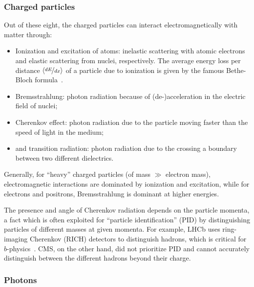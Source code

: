\subsubsection{Charged particles}

Out of these eight, the charged particles can interact electromagnetically with matter through:
\begin{itemize}
    \item Ionization and excitation of atoms: inelastic scattering with atomic electrons and elastic scattering from nuclei, respectively.
    The average energy loss per distance $\left\langle \cnicefrac{dE}{dx}\right\rangle$ of a particle due to ionization is given by the famous Bethe-Bloch formula~\cite{bethe1953passage}.
    \item Bremsstrahlung: photon radiation because of (de-)acceleration in the electric field of nuclei;
    \item Cherenkov effect: photon radiation due to the particle moving faster than the speed of light in the medium;
    \item and transition radiation: photon radiation due to the crossing a boundary between two different dielectrics.
\end{itemize}
Generally, for ``heavy'' charged particles (of mass $\gg$ electron mass), electromagnetic interactions are dominated by ionization and excitation, while for electrons and positrons, Bremsstrahlung is dominant at higher energies.

The presence and angle of Cherenkov radiation depends on the particle momenta, a fact which is often exploited for ``particle identification'' (PID) by distinguishing particles of different masses at given momenta.
For example, LHCb uses ring-imaging Cherenkov (RICH) detectors to distinguish hadrons, which is critical for $b$-physics~\cite{LHCb:2008vvz}.
CMS, on the other hand, did not prioritize PID and cannot accurately distinguish between the different hadrons beyond their charge.


\subsubsection{Photons}

